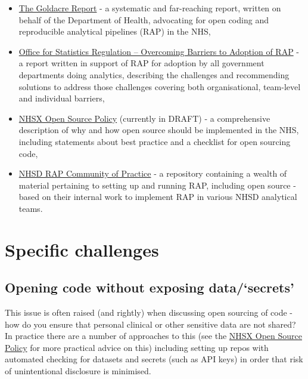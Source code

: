 \documentclass[
]{book}
\providecommand{\tightlist}{%
  \setlength{\itemsep}{0pt}\setlength{\parskip}{0pt}}
\begin{document}
\begin{itemize}
\tightlist
\item
  \href{https://www.gov.uk/government/publications/better-broader-safer-using-health-data-for-research-and-analysis}{The Goldacre Report} - a systematic and far-reaching report, written on behalf of the Department of Health, advocating for open coding and reproducible analytical pipelines (RAP) in the NHS,
\item
  \href{https://osr.statisticsauthority.gov.uk/publication/reproducible-analytical-pipelines-overcoming-barriers-to-adoption/}{Office for Statistics Regulation -- Overcoming Barriers to Adoption of RAP} - a report written in support of RAP for adoption by all government departments doing analytics, describing the challenges and recommending solutions to address those challenges covering both organisational, team-level and individual barriers,
\item
  \href{https://github.com/nhsx/open-source-policy}{NHSX Open Source Policy} (currently in DRAFT) - a comprehensive description of why and how open source should be implemented in the NHS, including statements about best practice and a checklist for open sourcing code,
\item
  \href{https://github.com/NHSDigital/rap-community-of-practice}{NHSD RAP Community of Practice} - a repository containing a wealth of material pertaining to setting up and running RAP, including open source - based on their internal work to implement RAP in various NHSD analytical teams.
\end{itemize}

\hypertarget{specific-challenges}{%
\section{Specific challenges}\label{specific-challenges}}

\hypertarget{opening-code-without-exposing-datasecrets}{%
\subsection{Opening code without exposing data/`secrets'}\label{opening-code-without-exposing-datasecrets}}

This issue is often raised (and rightly) when discussing open sourcing of code - how do you ensure that personal clinical or other sensitive data are not shared? In practice there are a number of approaches to this (see the \href{https://github.com/nhsx/open-source-policy}{NHSX Open Source Policy} for more practical advice on this) including setting up repos with automated checking for datasets and secrets (such as API keys) in order that risk of unintentional disclosure is minimised.
\end{document}

